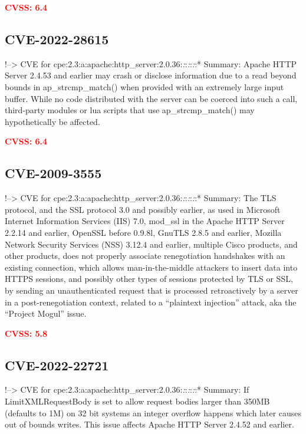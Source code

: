 \documentclass[a4paper, 12pt]{article}
\begin{document}
\textbf{\textcolor{red}{CVSS: 6.4}}

\hypertarget{cve-2022-28615}{%
\subsection{CVE-2022-28615}\label{cve-2022-28615}}

!--\textgreater{} CVE for
cpe:2.3:a:apache:http\_server:2.0.36:\emph{:}:\emph{:}:\emph{:}:*
Summary: Apache HTTP Server 2.4.53 and earlier may crash or disclose
information due to a read beyond bounds in ap\_strcmp\_match() when
provided with an extremely large input buffer. While no code distributed
with the server can be coerced into such a call, third-party modules or
lua scripts that use ap\_strcmp\_match() may hypothetically be affected.

\textbf{\textcolor{red}{CVSS: 6.4}}

\hypertarget{cve-2009-3555}{%
\subsection{CVE-2009-3555}\label{cve-2009-3555}}

!--\textgreater{} CVE for
cpe:2.3:a:apache:http\_server:2.0.36:\emph{:}:\emph{:}:\emph{:}:*
Summary: The TLS protocol, and the SSL protocol 3.0 and possibly
earlier, as used in Microsoft Internet Information Services (IIS) 7.0,
mod\_ssl in the Apache HTTP Server 2.2.14 and earlier, OpenSSL before
0.9.8l, GnuTLS 2.8.5 and earlier, Mozilla Network Security Services
(NSS) 3.12.4 and earlier, multiple Cisco products, and other products,
does not properly associate renegotiation handshakes with an existing
connection, which allows man-in-the-middle attackers to insert data into
HTTPS sessions, and possibly other types of sessions protected by TLS or
SSL, by sending an unauthenticated request that is processed
retroactively by a server in a post-renegotiation context, related to a
``plaintext injection'' attack, aka the ``Project Mogul'' issue.

\textbf{\textcolor{red}{CVSS: 5.8}}

\hypertarget{cve-2022-22721}{%
\subsection{CVE-2022-22721}\label{cve-2022-22721}}

!--\textgreater{} CVE for
cpe:2.3:a:apache:http\_server:2.0.36:\emph{:}:\emph{:}:\emph{:}:*
Summary: If LimitXMLRequestBody is set to allow request bodies larger
than 350MB (defaults to 1M) on 32 bit systems an integer overflow
happens which later causes out of bounds writes. This issue affects
Apache HTTP Server 2.4.52 and earlier.
\end{document}
